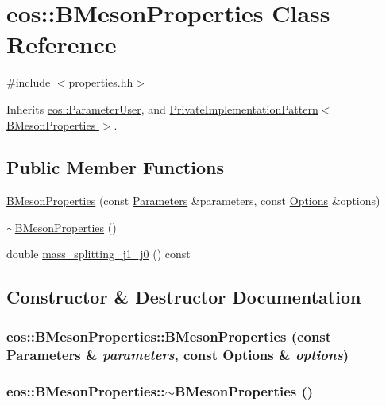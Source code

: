 \hypertarget{classeos_1_1BMesonProperties}{
\section{eos::BMesonProperties Class Reference}
\label{classeos_1_1BMesonProperties}
}


{\ttfamily \#include $<$properties.hh$>$}

Inherits \hyperlink{classeos_1_1ParameterUser}{eos::ParameterUser}, and \hyperlink{classeos_1_1PrivateImplementationPattern}{PrivateImplementationPattern$<$ BMesonProperties $>$}.\subsection*{Public Member Functions}
\begin{DoxyCompactItemize}
\item 
\hyperlink{classeos_1_1BMesonProperties_af127f7490e06b7a175fa3f82a0be7152}{BMesonProperties} (const \hyperlink{classeos_1_1Parameters}{Parameters} \&parameters, const \hyperlink{classeos_1_1Options}{Options} \&options)
\item 
\hyperlink{classeos_1_1BMesonProperties_aea9b828528431dfdfe7b13ca1fce9c14}{$\sim$BMesonProperties} ()
\item 
double \hyperlink{classeos_1_1BMesonProperties_aa79a7d1ef74dacb2c3b393ca9ad18225}{mass\_\-splitting\_\-j1\_\-j0} () const 
\end{DoxyCompactItemize}


\subsection{Constructor \& Destructor Documentation}
\hypertarget{classeos_1_1BMesonProperties_af127f7490e06b7a175fa3f82a0be7152}{
\subsubsection[{BMesonProperties}]{\setlength{\rightskip}{0pt plus 5cm}eos::BMesonProperties::BMesonProperties (const {\bf Parameters} \& {\em parameters}, \/  const {\bf Options} \& {\em options})}}
\label{classeos_1_1BMesonProperties_af127f7490e06b7a175fa3f82a0be7152}
\hypertarget{classeos_1_1BMesonProperties_aea9b828528431dfdfe7b13ca1fce9c14}{
\subsubsection[{$\sim$BMesonProperties}]{\setlength{\rightskip}{0pt plus 5cm}eos::BMesonProperties::$\sim$BMesonProperties ()}}
\label{classeos_1_1BMesonProperties_aea9b828528431dfdfe7b13ca1fce9c14}


